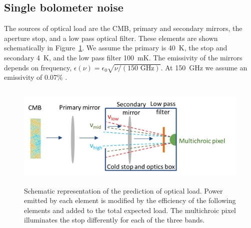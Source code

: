 \documentclass[]{spie}  %
\begin{document}
\subsection{Single bolometer noise}
\label{sec:det_noise}

The sources of optical load are the CMB, primary and secondary mirrors, the aperture stop, and a low pass optical filter.  These elements 
are shown schematically in Figure~\ref{fig:load}. 
We assume the primary is 40~K, the stop and secondary 4~K, and the low pass filter 100~mK. %
The emissivity of the mirrors depends on frequency, $\epsilon(\nu) =  \epsilon_0\sqrt{\nu / (\text{150~GHz})}$. At 150~GHz we assume an emissivity of 
0.07\% \cite{planck2011_hfi_temp,planck2018_lfi_mirrors}. 

\begin{figure} [ht]
\begin{center}
\hspace{1cm} \includegraphics[height=5cm]{load_calc_MCP.png}
\end{center}
\caption[load] { \label{fig:load} 
Schematic representation of the prediction of optical load.  Power emitted by each element is modified by the efficiency of the following elements 
and added to the total expected load.  The multichroic pixel illuminates the stop differently for each of the three bands.
}
\end{figure} 
\end{document}
